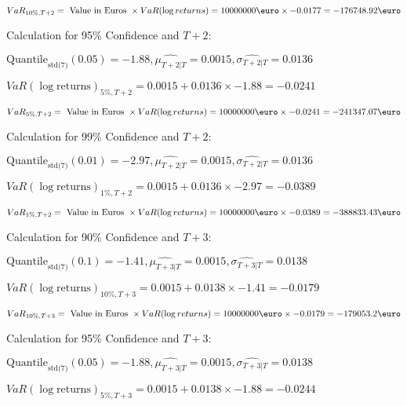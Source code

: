 \indent\indent $VaR_{10\%, T + 2} = \text{ Value in Euros } \times VaR(\log returns) = 10 000 000 \text{\euro} \times-0.0177 = -176748.92 \text{\euro}$\newline




Calculation for 95\% Confidence and $T+2$:

\indent\indent $\text{Quantile}_\text{std(7)}(0.05) = -1.88,\hat{\mu_{T+2|T}} = 0.0015, \hat{\sigma_{T+2|T}} = 0.0136$

\indent\indent $VaR(\log \text{returns})_{5\%, T + 2} = 0.0015 + 0.0136\times-1.88 = -0.0241$

\indent\indent $VaR_{5\%, T + 2} = \text{ Value in Euros } \times VaR(\log returns) = 10 000 000 \text{\euro} \times-0.0241 = -241347.07 \text{\euro}$\newline




Calculation for 99\% Confidence and $T+2$:

\indent\indent $\text{Quantile}_\text{std(7)}(0.01) = -2.97,\hat{\mu_{T+2|T}} = 0.0015, \hat{\sigma_{T+2|T}} = 0.0136$

\indent\indent $VaR(\log \text{returns})_{1\%, T + 2} = 0.0015 + 0.0136\times-2.97 = -0.0389$

\indent\indent $VaR_{1\%, T + 2} = \text{ Value in Euros } \times VaR(\log returns) = 10 000 000 \text{\euro} \times-0.0389 = -388833.43 \text{\euro}$\newline




Calculation for 90\% Confidence and $T+3$:

\indent\indent $\text{Quantile}_\text{std(7)}(0.1) = -1.41,\hat{\mu_{T+3|T}} = 0.0015, \hat{\sigma_{T+3|T}} = 0.0138$

\indent\indent $VaR(\log \text{returns})_{10\%, T + 3} = 0.0015 + 0.0138\times-1.41 = -0.0179$

\indent\indent $VaR_{10\%, T + 3} = \text{ Value in Euros } \times VaR(\log returns) = 10 000 000 \text{\euro} \times-0.0179 = -179053.2 \text{\euro}$\newline




Calculation for 95\% Confidence and $T+3$:

\indent\indent $\text{Quantile}_\text{std(7)}(0.05) = -1.88,\hat{\mu_{T+3|T}} = 0.0015, \hat{\sigma_{T+3|T}} = 0.0138$

\indent\indent $VaR(\log \text{returns})_{5\%, T + 3} = 0.0015 + 0.0138\times-1.88 = -0.0244$

